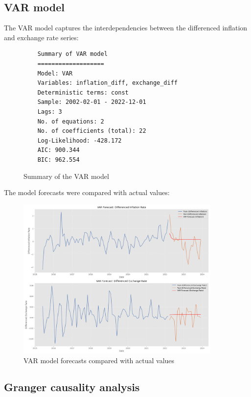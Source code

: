 \documentclass[11pt,a4paper]{article}
\begin{document}
\subsection{VAR model}

The VAR model captures the interdependencies between the differenced inflation and exchange rate series:

\begin{figure}[H]
    \centering
    \begin{verbatim}
    Summary of VAR model
    ===================
    Model: VAR
    Variables: inflation_diff, exchange_diff
    Deterministic terms: const
    Sample: 2002-02-01 - 2022-12-01
    Lags: 3
    No. of equations: 2
    No. of coefficients (total): 22
    Log-Likelihood: -428.172
    AIC: 900.344
    BIC: 962.554
    \end{verbatim}
    \caption{Summary of the VAR model}
    \label{fig:var_summary}
\end{figure}

The model forecasts were compared with actual values:

\begin{figure}[H]
    \centering
    \includegraphics[width=0.9\textwidth]{plots/multivariate/var_forecast.png}
    \caption{VAR model forecasts compared with actual values}
    \label{fig:var_forecast}
\end{figure}

\subsection{Granger causality analysis}
\end{document}
